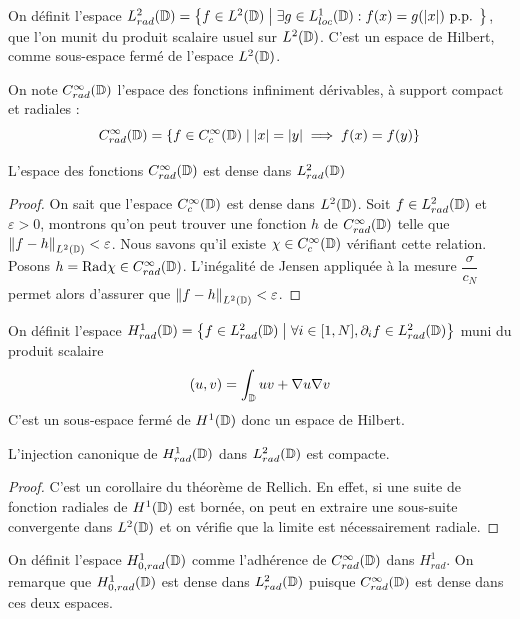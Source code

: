 \documentclass[11pt,a4paper]{article}
\begin{document}
\begin{Def} On définit l'espace $L^2_{rad}(\mathbb{D}) = \left\{f\in L^2(\mathbb{D})\mathrel{}\middle|\mathrel{}\exists g \in L^1_{loc}(\mathbb{D}) : f(x) = g(|x|) \text{ p.p. }\right\}$, que l'on munit du produit scalaire usuel sur $L^2(\mathbb{D})$. C'est un espace de Hilbert, comme sous-espace fermé de l'espace $L^2(\mathbb{D})$. 	
\end{Def}

\begin{Def} On note $C^\infty_{rad}(\mathbb{D})$ l'espace des fonctions infiniment dérivables, à support compact et radiales : \[C^\infty_{rad}(\mathbb{D}) = \left\{f\in C^\infty_c(\mathbb{D})\mathrel{}\middle|\mathrel{}|x| = |y| \implies f(x) = f(y)\right\}\]
\end{Def}


\begin{Prop}
L'espace des fonctions $C^\infty_{rad}(\mathbb{D})$ est dense dans $L^2_{rad}(\mathbb{D})$  
\begin{proof}
On sait que l'espace $C^\infty_c(\mathbb{D})$ est dense dans $L^2(\mathbb{D})$. Soit $f \in L^2_{rad}(\mathbb{D})$ et $\varepsilon > 0$, montrons qu'on peut trouver une fonction $h$ de $C^\infty_{rad}(\mathbb{D})$ telle que $\left\|f - h\right\|_{L^2(\mathbb{D})} < \varepsilon$. Nous savons qu'il existe $\chi \in C^\infty_c(\mathbb{D})$ vérifiant cette relation. Posons $h = \textup{Rad}\chi \in C^\infty_{rad}(\mathbb{D})$.
L'inégalité de Jensen appliquée à la mesure $\dfrac{\sigma}{c_N}$ permet alors d'assurer que $\left\|f - h\right\|_{L^2(\mathbb{D})} < \varepsilon$. 
\end{proof}
\end{Prop}

\begin{Def} On définit l'espace $H^1_{rad}(\mathbb{D})= \left\{f\in L^2_{rad}(\mathbb{D})\mathrel{}\middle|\mathrel{}\forall i \in [1,N], \partial_i f  \in L^2_{rad}(\mathbb{D})\right\}$ muni du produit scalaire \[(u,v) = \int_{\mathbb{D}} uv + \nabla u \nabla v\] C'est un sous-espace fermé de $H^1(\mathbb{D})$ donc un espace de Hilbert. 
\end{Def}

\begin{Prop} L'injection canonique de $H^1_{rad}(\mathbb{D})$ dans $L^2_{rad}(\mathbb{D})$ est compacte. 
\begin{proof} C'est un corollaire du théorème de Rellich. En effet, si une suite de fonction radiales de $H^1(\mathbb{D})$ est bornée, on peut en extraire une sous-suite convergente dans $L^2(\mathbb{D})$  et on vérifie que la limite est nécessairement radiale. 
\end{proof}

\end{Prop}

\begin{Def} On définit l'espace $H^1_{0,rad}(\mathbb{D})$ comme l'adhérence de $C^\infty_{rad}(\mathbb{D})$ dans $H^1_{rad}$. On remarque que $H^1_{0,rad}(\mathbb{D})$ est dense dans $L^2_{rad}(\mathbb{D})$ puisque $C^\infty_{rad}(\mathbb{D})$ est dense dans ces deux espaces.  
\end{Def}
\end{document}
